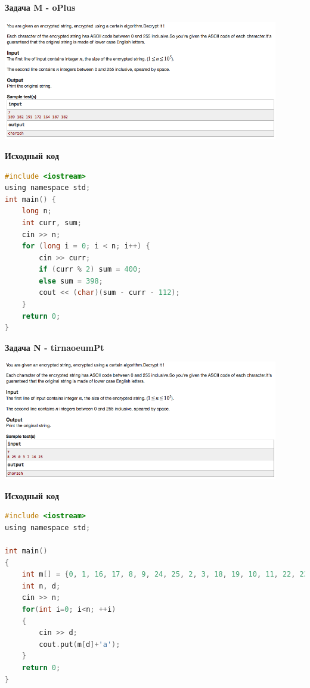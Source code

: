 \documentclass[a4paper,12pt]{article}
\begin{document}
\newpage
\textbf{{\large Задача M - oPlus}} \\
\begin{center}
\includegraphics[width=0.9\textwidth]{CT_Crypto/CT_Crypto_M.png}\\ [1cm]
\end{center}

\textbf{{\large Исходный код}}
\begin{lstlisting}[language=C]
#include <iostream>
using namespace std;
int main() {
	long n;
	int curr, sum;
	cin >> n;
	for (long i = 0; i < n; i++) {
		cin >> curr;
		if (curr % 2) sum = 400;
		else sum = 398;
		cout << (char)(sum - curr - 112);
	}
	return 0;
}
\end{lstlisting}

\newpage
\textbf{{\large Задача N - tirnaoeumPt}} \\
\begin{center}
\includegraphics[width=0.9\textwidth]{CT_Crypto/CT_Crypto_N.png}\\ [1cm]
\end{center}

\textbf{{\large Исходный код}}
\begin{lstlisting}[language=C]
#include <iostream>
using namespace std;

int main()
{
    int m[] = {0, 1, 16, 17, 8, 9, 24, 25, 2, 3, 18, 19, 10, 11, 22, 23, 4,  5,  20, 21, 12, 13, 22, 23, 6,  7,  22, 23, 14, 15};
    int n, d;
    cin >> n;
    for(int i=0; i<n; ++i)
    {
        cin >> d;
        cout.put(m[d]+'a');
    }
    return 0;
}
\end{lstlisting}
\end{document}
